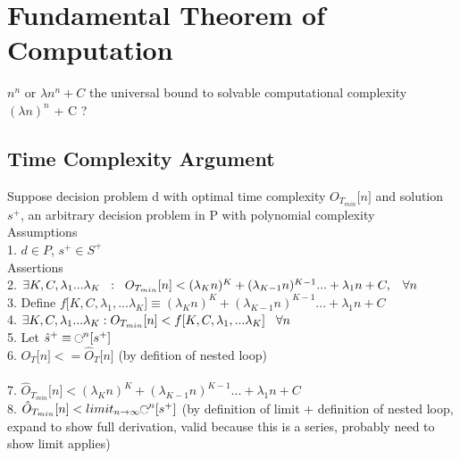\documentclass[11pt]{article}
\def \nestedloop {\ensuremath{\rotatebox[origin=c]{-90}{$\circlearrowright$}}^n}
\begin{document}
\newpage


\section{Fundamental Theorem of Computation}
$n^n$ or $\lambda n^n + C$ the universal bound to solvable computational complexity\\
$(\lambda n)^n$ + C ?\\






\subsection{Time Complexity Argument}
Suppose decision problem d with optimal time complexity $O_{T_{min}}\lbrack n \rbrack$ and solution $s^+$, an arbitrary decision problem in P with polynomial complexity\\
Assumptions\\
1. $d \in P$, $s^{+} \in S^{+}$\\
Assertions\\
2. $\exists K,C,\lambda_1...\lambda_K \hspace{2mm} : \hspace{2mm} O_{T_{min}}\lbrack n \rbrack < (\lambda_K n)^K + (\lambda_{K-1} n)^{K-1}... + \lambda_1 n + C, \hspace{3mm} \forall n\hspace{1mm}$
\\
3. Define $ f\lbrack K,C, \lambda_1,...\lambda_K \rbrack \equiv (\lambda_K n)^K + (\lambda_{K-1} n)^{K-1}... + \lambda_1 n + C$\\
4.  $\exists K,C,\lambda_1...\lambda_K : O_{T_{min}}\lbrack n \rbrack <   f\lbrack K,C, \lambda_1,...\lambda_K \rbrack \hspace{3mm} \forall n$\\
5. Let $\hat{s}^{+} \equiv \nestedloop \lbrack s^{+} \rbrack$\\
6. $O_T \lbrack n \rbrack <= \hat{O}_T \lbrack n\rbrack$ (by defition of nested loop)\\
\\
7.  $\hat{O}_{T_{min}}\lbrack n \rbrack < (\lambda_K n)^K + (\lambda_{K-1} n)^{K-1}... + \lambda_1 n + C$\\
8. $\hat{O}_{T_{min}} \lbrack n \rbrack < limit_{n \rightarrow \infty}  \nestedloop \lbrack s^{+} \rbrack$ (by definition of limit + definition of nested loop, expand to show full derivation, valid because this is a series, probably need to show limit applies)\\
\end{document}
